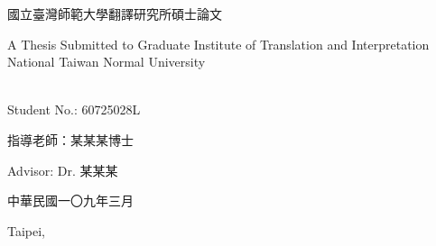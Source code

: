 \makeatletter
\begin{titlepage}%
  \begin{center}%
    {\large 國立臺灣師範大學翻譯研究所碩士論文\par}

    {\large A Thesis Submitted to Graduate Institute of Translation and Interpretation National Taiwan Normal University\par}
    \par
  \end{center}%
  \vspace{1cm plus 1fill}
  \begin{flushleft}%
    {{\Large\bfseries \@author}\\
      Student No.: 60725028L\par}
  \end{flushleft}%
  \vspace{8mm plus 1mm minus 2mm}
  \begin{center}%
    {\Large\textbf{\titlezh}}\par
    \vspace{1em}
    {\huge\textbf{\@title}\par}
    \vspace{2cm plus 1.5fill}
    {\large 指導老師：某某某博士}\par
    \vspace{0.5em}
    {\large Advisor: Dr. 某某某}\par
    \vspace{2cm}
    {\large 中華民國一〇九年三月}\par
    \vspace{0.5em}
    {\large Taipei, \@date}
  \end{center}
\end{titlepage}%
\makeatother